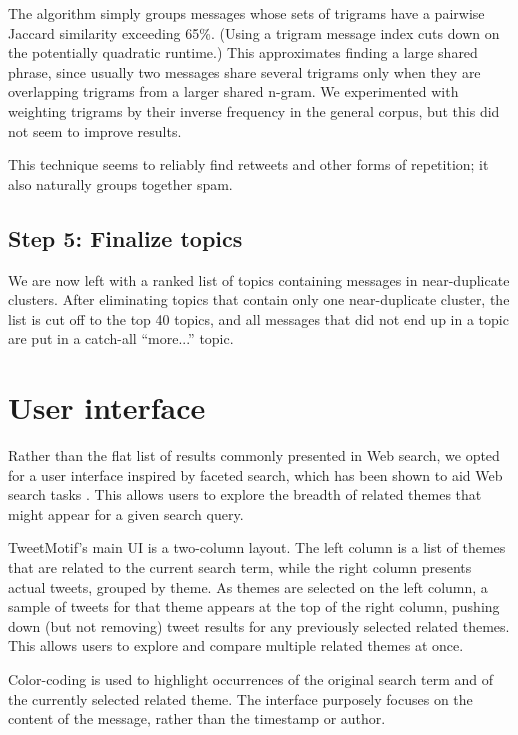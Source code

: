 \documentclass[letterpaper]{article}
\newcommand{\mikeyk}[1]{\textcolor{green}{\textbf{[#1 --mikeyk]}}}
\begin{document}

The algorithm simply groups messages whose sets of trigrams have a pairwise Jaccard similarity exceeding 65\%.  (Using a trigram message index cuts down on the potentially quadratic runtime.)  This approximates finding a large shared phrase, since usually two messages share several trigrams only when they are overlapping trigrams from a larger shared n-gram.  We experimented with weighting trigrams by their inverse frequency in the general corpus, but this did not seem to improve results.   

This technique seems to reliably find retweets and other forms of repetition; it also naturally groups together spam.


\subsection{Step 5: Finalize topics}

We are now left with a ranked list of topics containing messages in near-duplicate clusters.  After eliminating topics that contain only one near-duplicate cluster, the list is cut off to the top 40 topics, and all messages that did not end up in a topic are put in a catch-all ``more...'' topic.

\section{User interface}

Rather than the flat list of results commonly presented in Web search, we opted for a user interface inspired by faceted search, which has been shown to aid Web search tasks \cite{hearst_findingflow_2002}.
This allows users to explore the breadth of related themes that might appear for a given search query.

TweetMotif's main UI is a two-column layout. The left column is a list of themes that are related to the current search term, while the right column presents actual tweets, grouped by theme. As themes are selected on the left column, a sample of tweets for that theme appears at the top of the right column, pushing down (but not removing) tweet results for any previously selected related themes. This allows users to explore and compare multiple related themes at once. 

Color-coding is used to highlight occurrences of the original search term and of the currently selected related theme. The interface purposely focuses on the content of the message, rather than the timestamp or author.
\end{document}
